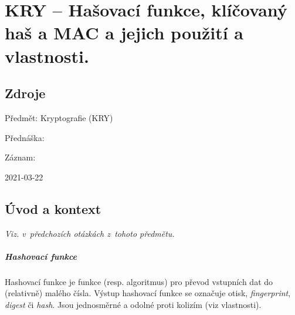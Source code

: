 

\graphicspath{{kry/hasovaci_funkce/figures}}


\chapter{KRY -- Hašovací funkce, klíčovaný haš a MAC a jejich použití a vlastnosti.}


\section{Zdroje}

\begin{compactitem}
    \item Předmět: Kryptografie (KRY)
    \item Přednáška:
    \begin{compactitem}
        \item {}
    \end{compactitem}
    \item Záznam:
    \begin{compactitem}
        \item 2021-03-22
    \end{compactitem}
\end{compactitem}


\section{Úvod a kontext}

\textit{Viz.  v~předchozích otázkách z~tohoto předmětu.}

\paragraph*{Hashovací funkce} Hashovací funkce je funkce (resp. algoritmus) pro převod vstupních dat do (relativně) malého čísla. Výstup hashovací funkce se označuje otisk, \textit{fingerprint}, \textit{digest} či \textit{hash}. Jsou jednosměrné a odolné proti kolizím (viz vlastnosti).

